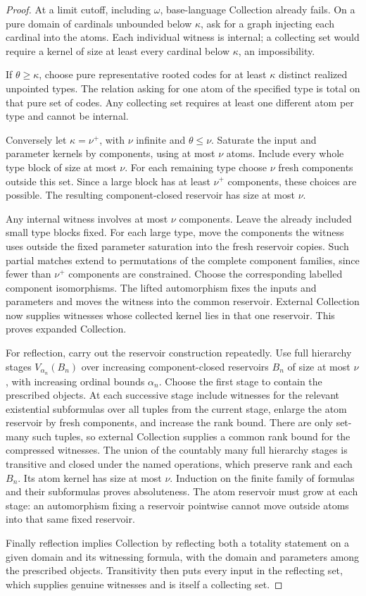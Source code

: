 \documentclass[11pt,letterpaper]{article}
\numberwithin{equation}{section}
\theoremstyle{plain}
\theoremstyle{definition}
\theoremstyle{remark}
\begin{document}
\begin{proof}
At a limit cutoff, including $\omega$, base-language Collection already fails.
On a pure domain of cardinals unbounded below $\kappa$, ask for a graph
injecting each cardinal into the atoms. Each individual witness is internal;
a collecting set would require a kernel of size at least every cardinal
below $\kappa$, an impossibility.

If $\theta\geq\kappa$, choose pure representative rooted codes for at least
$\kappa$ distinct realized unpointed types. The relation asking for one atom
of the specified type is total on that pure set of codes. Any collecting
set requires at least one different atom per type and cannot be internal.

Conversely let $\kappa=\nu^+$, with $\nu$ infinite and $\theta\leq\nu$.
Saturate the input and parameter kernels by components, using at most $\nu$
atoms. Include every whole type block of size at most $\nu$. For each remaining
type choose $\nu$ fresh components outside this set. Since a large block has
at least $\nu^+$ components, these choices are possible. The resulting
component-closed reservoir has size at most $\nu$.

Any internal witness involves at most $\nu$ components. Leave the already
included small type blocks fixed. For each large type, move the components
the witness uses outside the fixed parameter saturation into the fresh
reservoir copies. Such partial matches extend to permutations of the complete
component families, since fewer than $\nu^+$ components are constrained.
Choose the corresponding labelled component isomorphisms. The lifted
automorphism fixes the inputs and parameters and moves the witness into the
common reservoir. External Collection now supplies witnesses whose collected
kernel lies in that one reservoir. This proves expanded Collection.

For reflection, carry out the reservoir construction repeatedly. Use full
hierarchy stages $V_{\alpha_n}(B_n)$ over increasing component-closed reservoirs
$B_n$ of size at most $\nu$, with increasing ordinal bounds $\alpha_n$.
Choose the first stage to contain the prescribed objects. At each successive
stage include witnesses for the relevant existential subformulas over all
tuples from the current stage, enlarge the atom reservoir by fresh components,
and increase the rank bound. There are only set-many such tuples, so external
Collection supplies a common rank bound for the compressed witnesses.
The union of the countably many full hierarchy stages is transitive and
closed under the named operations, which preserve rank and each $B_n$.
Its atom kernel has size at most $\nu$. Induction on the finite family of
formulas and their subformulas proves absoluteness. The atom reservoir must
grow at each stage: an automorphism fixing a reservoir pointwise cannot move
outside atoms into that same fixed reservoir.

Finally reflection implies Collection by reflecting both a totality statement
on a given domain and its witnessing formula, with the domain and parameters
among the prescribed objects. Transitivity then puts every input in the
reflecting set, which supplies genuine witnesses and is itself a collecting
set.
\end{proof}
\end{document}
